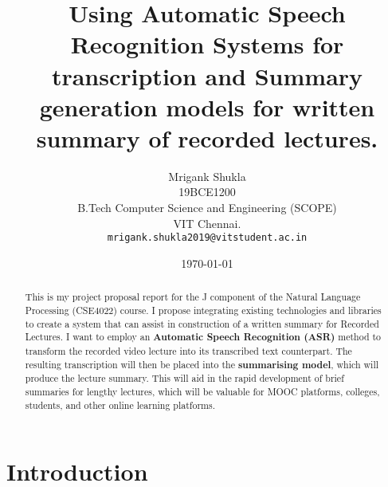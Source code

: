 \documentclass[11pt,a4paper]{article}
\title{ Using Automatic Speech Recognition Systems for transcription and Summary generation models for written summary of recorded lectures.}
\author{Mrigank Shukla\\
	19BCE1200  \\
	B.Tech Computer Science and Engineering (SCOPE)\\
	VIT Chennai. \\
	\texttt{mrigank.shukla2019@vitstudent.ac.in} %
}
\date{\today}
\begin{document}
	\maketitle
	\begin{abstract}
		This is my project proposal report for the J component of the Natural Language Processing (CSE4022) course.
		I propose integrating existing technologies and libraries to create a system that can assist in construction of a written summary for Recorded Lectures.
		I want to employ an \textbf{Automatic Speech Recognition (ASR)} method to transform the recorded video lecture into its transcribed text counterpart.
		The resulting transcription will then be placed into the\textbf{ summarising model}, which will produce the lecture summary.
		This will aid in the rapid development of brief summaries for lengthy lectures, which will be valuable for MOOC platforms, colleges, students, and other online learning platforms. 
	\end{abstract}
	

	
	\section{Introduction}
	
\end{document}
